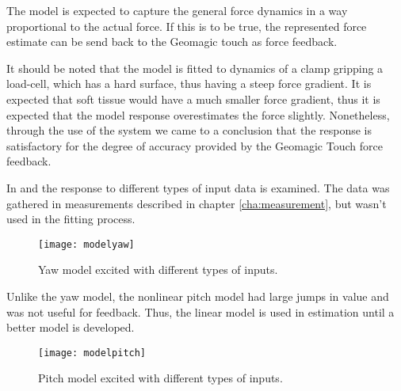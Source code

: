 

The model is expected to capture the general force dynamics in a way proportional to the actual force. If this is to be true, the represented force estimate can be send back to the Geomagic touch as force feedback.

It should be noted that the model is fitted to dynamics of a clamp gripping a load-cell, which has a hard surface, thus having a steep force gradient.
It is expected that soft tissue would have a much smaller force gradient, thus it is expected that the model response overestimates the force slightly.
Nonetheless, through the use of the system we came to a conclusion that the response is satisfactory for the degree of accuracy provided by the Geomagic Touch force feedback.

In  and  the response to different types of input data is examined.
The data was gathered in measurements described in chapter \ref{cha:measurement}, but wasn't used in the fitting process.


\begin{figure}[H]
\hspace{-3em}\texttt{[image: modelyaw]}
\caption{Yaw model excited with different types of inputs.}
\label{fig:final_res_yaw}
\end{figure}

Unlike the yaw model, the nonlinear pitch model had large jumps in value and was not useful for feedback.
Thus, the linear model is used in estimation until a better model is developed.

\begin{figure}[H]
\hspace{-2.5em}\texttt{[image: modelpitch]}
\caption{Pitch model excited with different types of inputs.}
\label{fig:final_res_pitch}
\end{figure}

